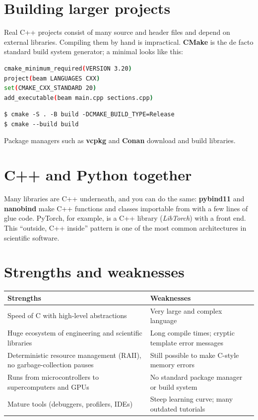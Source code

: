 \section{Building larger projects}

Real C++ projects consist of many source and header files and depend on external
libraries. Compiling them by hand is impractical. \textbf{CMake} is the de facto standard
build system generator; a minimal  looks like this:
\begin{lstlisting}[language=bash]
cmake_minimum_required(VERSION 3.20)
project(beam LANGUAGES CXX)
set(CMAKE_CXX_STANDARD 20)
add_executable(beam main.cpp sections.cpp)
\end{lstlisting}
\begin{lstlisting}[style=shell]
$ cmake -S . -B build -DCMAKE_BUILD_TYPE=Release
$ cmake --build build
\end{lstlisting}
Package managers such as \textbf{vcpkg} and \textbf{Conan} download and build libraries.

\section{C++ and Python together}

Many \py libraries are C++ underneath, and you can do the same: \textbf{pybind11} and
\textbf{nanobind} make C++ functions and classes importable from \py with a few lines of
glue code. PyTorch, for example, is a C++ library (\emph{LibTorch}) with a \py front end.
This ``\py outside, C++ inside'' pattern is one of the most common architectures in
scientific software.

\section{Strengths and weaknesses}

\begin{center}
\small
\begin{tabularx}{\linewidth}{@{}>{\raggedright\arraybackslash}X>{\raggedright\arraybackslash}X@{}}
\toprule
\textbf{Strengths} & \textbf{Weaknesses}\\
\midrule
Speed of C with high-level abstractions & Very large and complex language\\
Huge ecosystem of engineering and scientific libraries & Long compile times; cryptic template error messages\\
Deterministic resource management (RAII), no garbage-collection pauses & Still possible to make C-style memory errors\\
Runs from microcontrollers to supercomputers and GPUs & No standard package manager or build system\\
Mature tools (debuggers, profilers, IDEs) & Steep learning curve; many outdated tutorials\\
\bottomrule
\end{tabularx}
\end{center}

